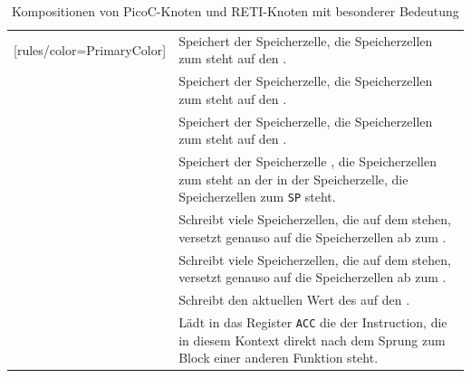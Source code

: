 \begin{table}[H]
\begin{NiceTabular}{X[16]X[20]}[rules/color=PrimaryColor]
   & Speichert  der Speicherzelle, die  Speicherzellen  zum   steht auf den . \\
   & Speichert  der Speicherzelle, die  Speicherzellen  zum   steht auf den . \\
   & Speichert  der Speicherzelle, die  Speicherzellen  zum    steht auf den . \\
   & Speichert  der Speicherzelle , die  Speicherzellen  zum    steht an der  in der Speicherzelle, die  Speicherzellen  zum   \verb|SP| steht. \\
   & Schreibt  viele Speicherzellen, die auf dem  stehen, versetzt genauso auf die Speicherzellen ab   zum   . \\
   & Schreibt  viele Speicherzellen, die auf dem  stehen, versetzt genauso auf die Speicherzellen ab   zum  . \\
   & Schreibt den aktuellen Wert des   auf den . \\
   & Lädt in das Register \verb|ACC| die  der Instruction, die in diesem Kontext direkt nach dem Sprung zum Block einer anderen Funktion steht.\\
  \bottomrule
\end{NiceTabular}
\caption{Kompositionen von PicoC-Knoten und RETI-Knoten mit besonderer Bedeutung}
\label{tab:kompositionen_von_picoc_knoten_und_reti_knoten_mit_besonderer_bedeutung}
\end{table}

